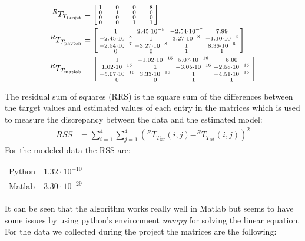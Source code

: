\documentclass[conference]{IEEEtran}
\begin{document}
\begin{align*}
^RT_{T_{\text{target}}} &= \begin{bsmallmatrix}1 &&&&&& 0 &&&&&& 0 &&&&&& 8 \\
                   0 &&&&&& 1 &&&&&& 0 &&&&&& 0 \\
                   0 &&&&&& 0 &&&&&& 0 &&&&&& 0 \\
                   0 &&&&&& 0 &&&&&& 1 &&&&&& 1 \end{bsmallmatrix} \\
^RT_{T_{\text{phyton}}} &= 
    \begin{bsmallmatrix}1 & 2.45\cdot 10^{-8} & -2.54\cdot 10^{-7}& 7.99 \\
                   -2.45\cdot 10^{-8} & 1 & 3.27\cdot 10^{-8} & -1.10\cdot 10^{-6} \\
                   -2.54\cdot 10^{-7} & -3.27\cdot 10^{-8} & 1 & 8.36\cdot 10^{-6} \\
                   0 & 0 & 1 & 1 \end{bsmallmatrix}\\
^RT_{T_{\text{matlab}}} &= 
    \begin{bsmallmatrix}1 & -1.02\cdot 10^{-15} & 5.07\cdot 10^{-16}& 8.00 \\
                  1.02\cdot 10^{-15} & 1 & -3.05\cdot 10^{-16} & -2.58\cdot 10^{-15} \\
                  -5.07\cdot 10^{-16} & 3.33\cdot 10^{-16} & 1 & -4.51\cdot 10^{-15} \\
                   0 & 0 & 1 & 1\end{bsmallmatrix}             
\end{align*}

The residual sum of squares (RRS) is the square sum of the differences between the target values and estimated values of each entry in the matrices which is used to measure the discrepancy between the data and the estimated model:
\begin{align*}
RSS &= \sum_{i=1}^4\sum_{j=1}^4 (^RT_{T_{\text{tar}}}(i,j) - ^RT_{T_{\text{est}}}(i,j))^2
\end{align*}
For the modeled data the RSS are:
\begin{center}
\begin{tabular}{l|r}
Python & \(1.32\cdot 10^{-10}\) \\
Matlab & \(3.30\cdot 10^{-29}\)
\end{tabular}
\end{center}
It can be seen that the algorithm works really well in Matlab but seems to have some issues by using python's environment \textit{numpy} for solving the linear equation.\\
For the data we collected during the project the matrices are the following:
\end{document}
